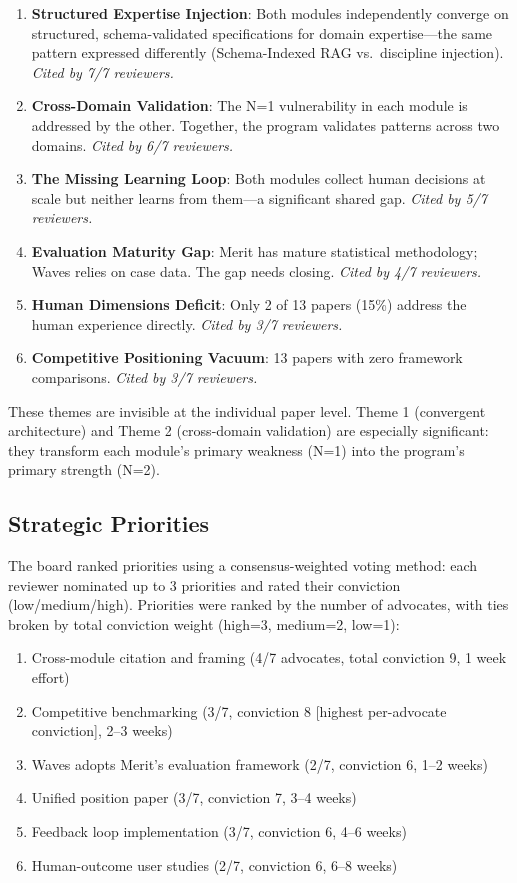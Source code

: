 \begin{enumerate}
    \item \textbf{Structured Expertise Injection}: Both modules independently converge on structured, schema-validated specifications for domain expertise---the same pattern expressed differently (Schema-Indexed RAG vs.\ discipline injection). \textit{Cited by 7/7 reviewers.}

    \item \textbf{Cross-Domain Validation}: The N=1 vulnerability in each module is addressed by the other. Together, the program validates patterns across two domains. \textit{Cited by 6/7 reviewers.}

    \item \textbf{The Missing Learning Loop}: Both modules collect human decisions at scale but neither learns from them---a significant shared gap. \textit{Cited by 5/7 reviewers.}

    \item \textbf{Evaluation Maturity Gap}: Merit has mature statistical methodology; Waves relies on case data. The gap needs closing. \textit{Cited by 4/7 reviewers.}

    \item \textbf{Human Dimensions Deficit}: Only 2 of 13 papers (15\%) address the human experience directly. \textit{Cited by 3/7 reviewers.}

    \item \textbf{Competitive Positioning Vacuum}: 13 papers with zero framework comparisons. \textit{Cited by 3/7 reviewers.}
\end{enumerate}

These themes are invisible at the individual paper level. Theme 1 (convergent architecture) and Theme 2 (cross-domain validation) are especially significant: they transform each module's primary weakness (N=1) into the program's primary strength (N=2).

\subsection{Strategic Priorities}

The board ranked priorities using a consensus-weighted voting method: each reviewer nominated up to 3 priorities and rated their conviction (low/medium/high). Priorities were ranked by the number of advocates, with ties broken by total conviction weight (high=3, medium=2, low=1):

\begin{enumerate}
    \item Cross-module citation and framing (4/7 advocates, total conviction 9, 1 week effort)
    \item Competitive benchmarking (3/7, conviction 8 [highest per-advocate conviction], 2--3 weeks)
    \item Waves adopts Merit's evaluation framework (2/7, conviction 6, 1--2 weeks)
    \item Unified position paper (3/7, conviction 7, 3--4 weeks)
    \item Feedback loop implementation (3/7, conviction 6, 4--6 weeks)
    \item Human-outcome user studies (2/7, conviction 6, 6--8 weeks)
\end{enumerate}
